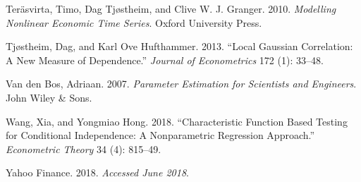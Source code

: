 \documentclass[
  12pt,
  letterpaper]{article}
\numberwithin{equation}{section}
\newlength{\cslhangindent}
\newenvironment{cslreferences}%
  {\setlength{\parindent}{0pt}%
  \everypar{\setlength{\hangindent}{\cslhangindent}}\ignorespaces}%
  {\par}
\begin{document}
\begin{cslreferences}
\leavevmode\hypertarget{ref-terasvirta2010modelling}{}%
Teräsvirta, Timo, Dag Tjøstheim, and Clive W. J. Granger. 2010. \emph{Modelling Nonlinear Economic Time Series}. Oxford University Press.

\leavevmode\hypertarget{ref-tjostheim2013local}{}%
Tjøstheim, Dag, and Karl Ove Hufthammer. 2013. ``Local Gaussian Correlation: A New Measure of Dependence.'' \emph{Journal of Econometrics} 172 (1): 33--48.

\leavevmode\hypertarget{ref-van2007parameter}{}%
Van den Bos, Adriaan. 2007. \emph{Parameter Estimation for Scientists and Engineers}. John Wiley \& Sons.

\leavevmode\hypertarget{ref-wang2017characteristic}{}%
Wang, Xia, and Yongmiao Hong. 2018. ``Characteristic Function Based Testing for Conditional Independence: A Nonparametric Regression Approach.'' \emph{Econometric Theory} 34 (4): 815--49.

\leavevmode\hypertarget{ref-yahoo}{}%
Yahoo Finance. 2018. \emph{Accessed June 2018}.
\end{cslreferences}
\end{document}

